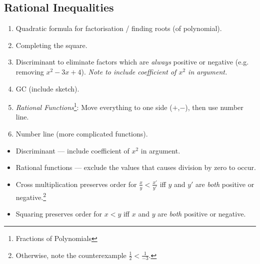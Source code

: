 \documentclass[oneside]{book}
\theoremstyle{definition}
\theoremstyle{plain}
\theoremstyle{remark}
\theoremstyle{plain}
\begin{document}
\subsection{Rational Inequalities}
\begin{tcolorbox}[
    colback=yellow!20,
    boxrule=1pt,
    boxsep=1pt,
    left=2pt,right=2pt,top=2pt,bottom=2pt,
    oversize=2pt,
    colframe=blue!75!black,
    before skip=\topsep,
    after skip=\topsep,
    title=General Methods,
]
    \begin{enumerate}
        \item Quadratic formula for factorisation / finding roots (of polynomial).
        \item Completing the square.
        \item Discriminant to eliminate factors which are \emph{always} positive or negative (e.g. removing \(x^2-3x+4\)). \emph{Note to include coefficient of \(x^2\) in argument.}
        \item GC (include sketch).
        \item \emph{Rational Functions}\footnote{Fractions of Polynomials}: Move everything to one side (\(+\),\(-\)), then use number line.
        \item Number line (more complicated functions).
    \end{enumerate}
\end{tcolorbox}
\begin{IN}
    \begin{itemize}[label=\footnotesize \(\square\) \normalsize]
        \item Discriminant --- include coefficient of \(x^2\) in argument.
        \item Rational functions --- exclude the values that causes division by zero to occur. 
        \item Cross multiplication preserves order for \(\frac{x}{y}<\frac{x'}{y'}\) iff \(y\) and \(y'\) are \emph{both} positive or negative.\footnote{Otherwise, note the counterexample \(\frac{1}{2}<\frac{1}{-3}\).}
        \item Squaring preserves order for \(x<y\) iff \(x\) and \(y\) are \emph{both} positive or negative.
    \end{itemize}
\end{IN}
\end{document}
